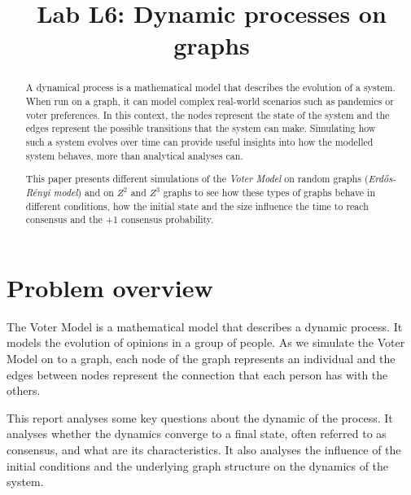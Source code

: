 \documentclass[conference]{IEEEtran}
\begin{document}
\title{
Lab L6: Dynamic processes on graphs
}

\author{
}

\maketitle
\begin{abstract}
    A dynamical process is a mathematical model that describes the evolution of a system.
    When run on a graph, it can model complex real-world scenarios such as pandemics or voter preferences.
    In this context, the nodes represent the state of the system and the edges represent the possible transitions that the system can make. 
    Simulating how such a system evolves over time can provide useful insights into how the modelled system behaves, more than analytical analyses can. 

    This paper presents different simulations of the \textit{Voter Model} on random graphs (\textit{Erdős-Rényi model}) and on $Z^2$ and $Z^3$ graphs to see how these types of graphs behave in different conditions, how the initial state and the size influence the time to reach consensus and the +1 consensus probability.

\end{abstract}

\section{Problem overview}

    The Voter Model is a mathematical model that describes a dynamic process.
    It models the evolution of opinions in a group of people.  
    As we simulate the Voter Model on to a graph, each node of the graph represents an individual and the edges between nodes represent the connection that each person has with the others.

    This report analyses some key questions about the dynamic of the process.
    It analyses whether the dynamics converge to a final state, often referred to as consensus, and what are its characteristics.
    It also analyses the influence of the initial conditions and the underlying graph structure on the dynamics of the system.
\end{document}
